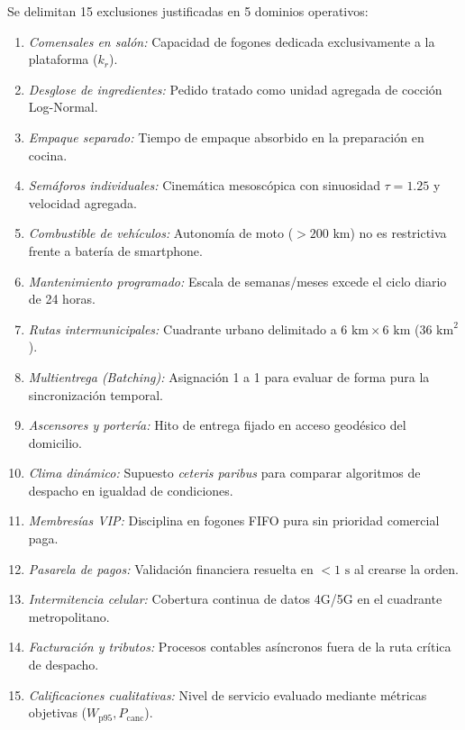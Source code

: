 \documentclass[11pt,letterpaper]{article}
\begin{document}
\noindent Se delimitan 15 exclusiones justificadas en 5 dominios operativos:
\begin{enumerate}[leftmargin=1.5em, itemsep=0.15em]
    \item \textit{Comensales en salón:} Capacidad de fogones dedicada exclusivamente a la plataforma ($k_r$).
    \item \textit{Desglose de ingredientes:} Pedido tratado como unidad agregada de cocción Log-Normal.
    \item \textit{Empaque separado:} Tiempo de empaque absorbido en la preparación en cocina.
    \item \textit{Semáforos individuales:} Cinemática mesoscópica con sinuosidad $\tau = 1.25$ y velocidad agregada.
    \item \textit{Combustible de vehículos:} Autonomía de moto ($> 200\text{ km}$) no es restrictiva frente a batería de smartphone.
    \item \textit{Mantenimiento programado:} Escala de semanas/meses excede el ciclo diario de 24 horas.
    \item \textit{Rutas intermunicipales:} Cuadrante urbano delimitado a $6\text{ km} \times 6\text{ km}$ ($36\text{ km}^2$).
    \item \textit{Multientrega (Batching):} Asignación 1 a 1 para evaluar de forma pura la sincronización temporal.
    \item \textit{Ascensores y portería:} Hito de entrega fijado en acceso geodésico del domicilio.
    \item \textit{Clima dinámico:} Supuesto \textit{ceteris paribus} para comparar algoritmos de despacho en igualdad de condiciones.
    \item \textit{Membresías VIP:} Disciplina en fogones FIFO pura sin prioridad comercial paga.
    \item \textit{Pasarela de pagos:} Validación financiera resuelta en $< 1\text{ s}$ al crearse la orden.
    \item \textit{Intermitencia celular:} Cobertura continua de datos 4G/5G en el cuadrante metropolitano.
    \item \textit{Facturación y tributos:} Procesos contables asíncronos fuera de la ruta crítica de despacho.
    \item \textit{Calificaciones cualitativas:} Nivel de servicio evaluado mediante métricas objetivas ($W_{\text{p95}}, P_{\text{canc}}$).
\end{enumerate}
\end{document}
